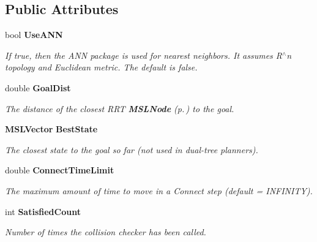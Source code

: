 \subsection*{Public Attributes}
\begin{CompactItemize}
\item 
bool {\bf Use\-ANN}
\begin{CompactList}\small\item\em If true, then the ANN package is used for nearest neighbors. It assumes R$^\wedge$n topology and Euclidean metric. The default is false.\item\end{CompactList}\item 
double {\bf Goal\-Dist}
\begin{CompactList}\small\item\em The distance of the closest RRT {\bf MSLNode} {\rm (p.\,\pageref{classMSLNode})} to the goal.\item\end{CompactList}\item 
{\bf MSLVector} {\bf Best\-State}
\begin{CompactList}\small\item\em The closest state to the goal so far (not used in dual-tree planners).\item\end{CompactList}\item 
double {\bf Connect\-Time\-Limit}
\begin{CompactList}\small\item\em The maximum amount of time to move in a Connect step (default = INFINITY).\item\end{CompactList}\item 
int {\bf Satisfied\-Count}
\begin{CompactList}\small\item\em Number of times the collision checker has been called.\item\end{CompactList}\end{CompactItemize}
